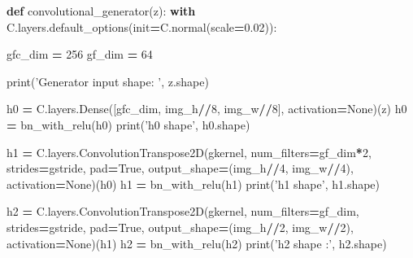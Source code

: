 \documentclass[]{book}
\newenvironment{Shaded}{\begin{snugshade}}{\end{snugshade}}
\newcommand{\KeywordTok}[1]{\textcolor[rgb]{0.13,0.29,0.53}{\textbf{#1}}}
\newcommand{\DecValTok}[1]{\textcolor[rgb]{0.00,0.00,0.81}{#1}}
\newcommand{\FloatTok}[1]{\textcolor[rgb]{0.00,0.00,0.81}{#1}}
\newcommand{\StringTok}[1]{\textcolor[rgb]{0.31,0.60,0.02}{#1}}
\newcommand{\VariableTok}[1]{\textcolor[rgb]{0.00,0.00,0.00}{#1}}
\newcommand{\ControlFlowTok}[1]{\textcolor[rgb]{0.13,0.29,0.53}{\textbf{#1}}}
\newcommand{\OperatorTok}[1]{\textcolor[rgb]{0.81,0.36,0.00}{\textbf{#1}}}
\newcommand{\BuiltInTok}[1]{#1}
\newcommand{\NormalTok}[1]{#1}
\theoremstyle{definition}
\theoremstyle{definition}
\theoremstyle{definition}
\theoremstyle{remark}
\begin{document}
\begin{Shaded}
\begin{Highlighting}[]
\KeywordTok{def}\NormalTok{ convolutional_generator(z):}
    \ControlFlowTok{with}\NormalTok{ C.layers.default_options(init}\OperatorTok{=}\NormalTok{C.normal(scale}\OperatorTok{=}\FloatTok{0.02}\NormalTok{)):}
        
\NormalTok{        gfc_dim }\OperatorTok{=} \DecValTok{256}
\NormalTok{        gf_dim }\OperatorTok{=} \DecValTok{64}
        
        \BuiltInTok{print}\NormalTok{(}\StringTok{'Generator input shape: '}\NormalTok{, z.shape)}
        
\NormalTok{        h0 }\OperatorTok{=}\NormalTok{ C.layers.Dense([gfc_dim, img_h}\OperatorTok{//}\DecValTok{8}\NormalTok{, img_w}\OperatorTok{//}\DecValTok{8}\NormalTok{], activation}\OperatorTok{=}\VariableTok{None}\NormalTok{)(z)}
\NormalTok{        h0 }\OperatorTok{=}\NormalTok{ bn_with_relu(h0)}
        \BuiltInTok{print}\NormalTok{(}\StringTok{'h0 shape'}\NormalTok{, h0.shape)}

\NormalTok{        h1 }\OperatorTok{=}\NormalTok{ C.layers.ConvolutionTranspose2D(gkernel,}
\NormalTok{                                  num_filters}\OperatorTok{=}\NormalTok{gf_dim}\OperatorTok{*}\DecValTok{2}\NormalTok{,}
\NormalTok{                                  strides}\OperatorTok{=}\NormalTok{gstride,}
\NormalTok{                                  pad}\OperatorTok{=}\VariableTok{True}\NormalTok{,}
\NormalTok{                                  output_shape}\OperatorTok{=}\NormalTok{(img_h}\OperatorTok{//}\DecValTok{4}\NormalTok{, img_w}\OperatorTok{//}\DecValTok{4}\NormalTok{),}
\NormalTok{                                  activation}\OperatorTok{=}\VariableTok{None}\NormalTok{)(h0)}
\NormalTok{        h1 }\OperatorTok{=}\NormalTok{ bn_with_relu(h1)}
        \BuiltInTok{print}\NormalTok{(}\StringTok{'h1 shape'}\NormalTok{, h1.shape)}

\NormalTok{        h2 }\OperatorTok{=}\NormalTok{ C.layers.ConvolutionTranspose2D(gkernel,}
\NormalTok{                                  num_filters}\OperatorTok{=}\NormalTok{gf_dim,}
\NormalTok{                                  strides}\OperatorTok{=}\NormalTok{gstride,}
\NormalTok{                                  pad}\OperatorTok{=}\VariableTok{True}\NormalTok{,}
\NormalTok{                                  output_shape}\OperatorTok{=}\NormalTok{(img_h}\OperatorTok{//}\DecValTok{2}\NormalTok{, img_w}\OperatorTok{//}\DecValTok{2}\NormalTok{),}
\NormalTok{                                  activation}\OperatorTok{=}\VariableTok{None}\NormalTok{)(h1)}
\NormalTok{        h2 }\OperatorTok{=}\NormalTok{ bn_with_relu(h2)}
        \BuiltInTok{print}\NormalTok{(}\StringTok{'h2 shape :'}\NormalTok{, h2.shape)}
        

\end{Highlighting}
\end{Shaded}
\end{document}

